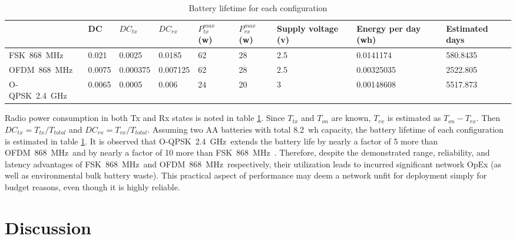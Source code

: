 \documentclass[sensors,article,submit,moreauthors,pdftex]{Definitions/mdpi}
\newcommand{\fsk}          {FSK~868~MHz}
\newcommand{\oqpsk}        {O-QPSK~2.4~GHz}
\newcommand{\ofdm}         {OFDM~868~MHz}
\begin{document}
\begin{table}
    \centering
    \begin{tabular}{|l|l|l|l|l|l|l|l|l|}
        \hline
                & DC     & $DC_{tx}$ & $DC_{rx}$ & $P_{tx}^{max}$ (w) & $P_{rx}^{max}$(w) & Supply voltage (v) & Energy per day (wh) & \textbf{Estimated days} \\ \hline
        \fsk\   & 0.021  & 0.0025    & 0.0185    & 62             & 28             & 2.5            & 0.0141174           & 580.8435       \\ \hline
        \ofdm\  & 0.0075 & 0.000375  & 0.007125  & 62             & 28             & 2.5            & 0.00325035          & 2522.805       \\ \hline
        \oqpsk\ & 0.0065 & 0.0005    & 0.006     & 24             & 20             & 3              & 0.00148608          & 5517.873       \\ \hline
    \end{tabular}
    \caption{Battery lifetime for each configuration}
    \label{tab:energy_table}
\end{table}


Radio power consumption in both Tx and Rx states is noted in table \ref{tab:energy_table}.
Since $T_{tx}$ and $T_{on}$ are known, $T_{rx}$ is estimated as $T_{on}-T_{rx}$.
Then $DC_{tx}=T_{tx}/T_{total}$ and $DC_{rx}=T_{rx}/T_{total}$.
Assuming two AA batteries with total 8.2~wh capacity, the battery lifetime of each configuration is estimated in table \ref{tab:energy_table}.
It is observed that \oqpsk\ extends the battery life by nearly a factor of 5 more than \ofdm\ and by nearly a factor of 10  more than \fsk\ .
Therefore, despite the demonstrated range, reliability, and latency advantages of \fsk\ and \ofdm\ respectively, their utilization leads to incurred significant network OpEx (as well as environmental bulk battery waste).
This practical aspect of performance may deem a network unfit for deployment simply for budget reasons, even though it is highly reliable. 

\section{Discussion}
\label{sec:discussion}
\end{document}
